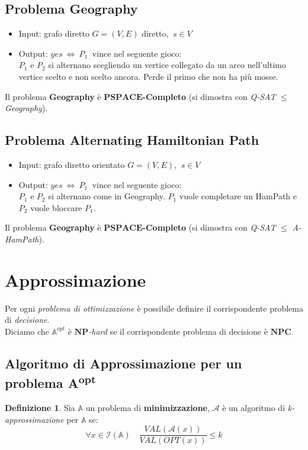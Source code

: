 \documentclass[a4paper]{article}
\theoremstyle{definition}
\newtheorem{definit}{Definizione}[subsection]
\newcommand{\np}{\mathbf{NP}}
\newcommand{\npc}{\mathbf{NPC}}
\newcommand{\pspace}{\mathbf{PSPACE}}
\newcommand{\prob}[1]{\mathbb{#1}}
\newcommand{\instance}[1]{\mathcal{I}(\prob{#1})}
\newcommand{\alg}[1]{\mathcal{#1}}
\begin{document}
		
		\subsection{Problema Geography}
			\begin{itemize}
				\item Input: grafo diretto $ G = (V, E) $ diretto, $ \ s \in V $
				\item Output: $ yes \ \Leftrightarrow\ P_1 \ $ vince nel seguente gioco:\\
				$ P_1 $ e $ P_2 $ si alternano scegliendo un vertice collegato da un arco nell'ultimo vertice scelto e non scelto ancora. Perde il primo che non ha più mosse.
			\end{itemize}
		
		\noindent
		Il problema \textbf{Geography} è $\pspace$\textbf{-Completo} (si dimostra con \textit{Q-SAT} $\leq$ \textit{Geography}).
		
		\subsection{Problema Alternating Hamiltonian Path}
			\begin{itemize}
				\item Input: grafo diretto orientato $ G = (V, E) $, $ \ s\in V $
				\item Output: $ yes\ \Leftrightarrow\ P_1 \ $ vince nel seguente gioco:\\
				$ P_1 $ e $ P_2 $ si alternano come in Geography. $ P_1 $ vuole completare un HamPath e $ P_2 $ vuole bloccare $ P_1 $.
			\end{itemize}
		
		\noindent
		Il problema \textbf{Geography} è $\pspace$\textbf{-Completo} (si dimostra con \textit{Q-SAT} $\leq$ \textit{A-HamPath}).
		
		
	\section{Approssimazione}
		Per ogni \textit{problema di ottimizzazione} è possibile definire il corrispondente problema di \textit{decisione}.\\
		Diciamo che $\mathbb{A}^{opt}$ è $\np$\textit{-hard} se il corrispondente problema di decisione è $\npc$.
		
		\subsection{Algoritmo di Approssimazione per un problema A\textsuperscript{opt}}
		\begin{definit}
			Sia $\mathbb{A}$ un problema di \textbf{minimizzazione}, $\mathcal{A}$ è un algoritmo di \textit{k-approssimazione} per $\mathbb{A}$ se: 
			\[
				\forall x \in \instance{A}\quad \dfrac{VAL(\alg{A}(x))}{VAL(OPT(x))}\leq k
			\]
			
		\end{definit}
	
\end{document}
